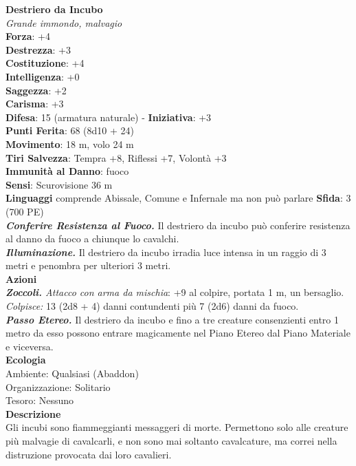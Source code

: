 \begin{multicols}{2}
\medskip\textbf{Destriero da Incubo}\\
\emph{Grande immondo, malvagio}\\
\textbf{Forza}: +4\\
\textbf{Destrezza}: +3\\
\textbf{Costituzione}: +4\\
\textbf{Intelligenza}: +0\\
\textbf{Saggezza}: +2\\
\textbf{Carisma}: +3\\
\textbf{Difesa}: 15 (armatura naturale) - \textbf{Iniziativa}: +3\\
\textbf{Punti Ferita}: 68 (8d10 + 24)\\
\textbf{Movimento}: 18 m, volo 24 m\\
\textbf{Tiri Salvezza}: Tempra +8, Riflessi +7, Volontà +3\\
\textbf{Immunità al Danno}: fuoco\\
\textbf{Sensi}: Scurovisione 36 m\\
\textbf{Linguaggi} comprende Abissale, Comune e Infernale ma non può parlare
\textbf{Sfida}: 3 (700 PE)\smallskip\\
\emph{\textbf{Conferire Resistenza al Fuoco.}} Il destriero da incubo può conferire resistenza al danno da fuoco a chiunque lo cavalchi.\\
\emph{\textbf{Illuminazione.}} Il destriero da incubo irradia luce intensa in un raggio di 3 metri e penombra per ulteriori 3 metri.\\
\smallskip\textbf{Azioni}\\
\emph{\textbf{Zoccoli.} Attacco con arma da mischia}: +9 al colpire, portata 1 m, un bersaglio.\\
\emph{Colpisce:} 13 (2d8 + 4) danni contundenti più 7 (2d6) danni da fuoco.\\
\emph{\textbf{Passo Etereo.}} Il destriero da incubo e fino a tre creature consenzienti entro 1 metro da esso possono entrare magicamente nel Piano Etereo dal Piano Materiale e viceversa.\\
\textbf{Ecologia}\\
Ambiente: Qualsiasi (Abaddon)\\
Organizzazione: Solitario\\
Tesoro: Nessuno\\
\textbf{Descrizione}\\
Gli incubi sono fiammeggianti messaggeri di morte. Permettono solo alle creature più malvagie di cavalcarli, e non sono mai soltanto cavalcature, ma correi nella distruzione provocata dai loro cavalieri.\\


\end{multicols}
